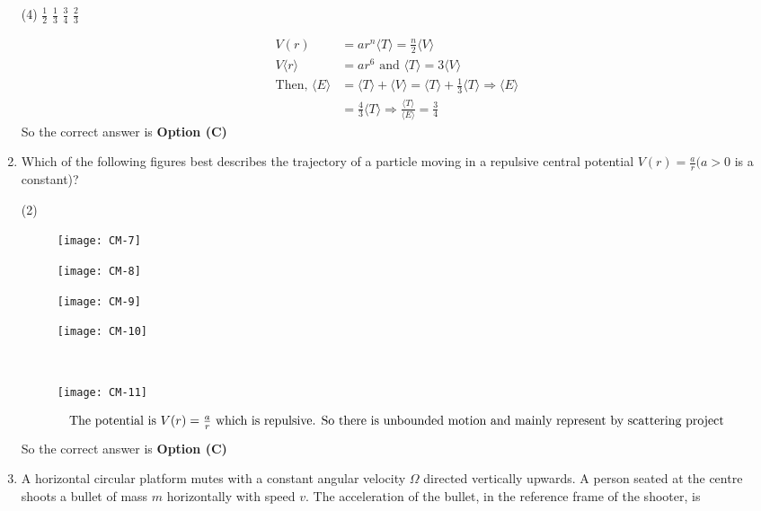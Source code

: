 \begin{enumerate}
\begin{tasks}(4)
\task[\textbf{A.}] $\frac{1}{2}$
\task[\textbf{B.}] $\frac{1}{3}$
\task[\textbf{C.}] $\frac{3}{4}$
\task[\textbf{D.}] $\frac{2}{3}$
\end{tasks}
\begin{answer}
\begin{align*}
V(r)&=a r^{n}\langle T\rangle=\frac{n}{2}\langle V\rangle\\
V\langle r\rangle&=a r^{6}\text{ and }\langle T\rangle=3\langle V\rangle\\
\text{Then, }\langle E\rangle&=\langle T\rangle+\langle V\rangle=\langle T\rangle+\frac{1}{3}\langle T\rangle \Rightarrow\langle E\rangle\\&=\frac{4}{3}\langle T\rangle \Rightarrow \frac{\langle T\rangle}{\langle E\rangle}=\frac{3}{4}
\end{align*}
So the correct answer is \textbf{Option (C)}
\end{answer}
	\item Which of the following figures best describes the trajectory of a particle moving in a repulsive central potential $V(r)=\frac{a}{r}(a>0$ is a constant)?

\begin{tasks}(2)
\task[\textbf{A.}] \begin{figure}[H]
	\centering
	\texttt{[image: CM-7]}
\end{figure}
\task[\textbf{B.}] \begin{figure}[H]
	\centering
	\texttt{[image: CM-8]}
\end{figure}
\task[\textbf{C.}] \begin{figure}[H]
	\centering
	\texttt{[image: CM-9]}
\end{figure}
\task[\textbf{D.}] \begin{figure}[H]
	\centering
	\texttt{[image: CM-10]}
\end{figure}
\end{tasks}
\begin{answer}$\left. \right. $
\begin{figure}[H]
	\centering
	\texttt{[image: CM-11]}
\end{figure}
\begin{align*}
\intertext{The potential is $V(r)=\frac{a}{r}$ which is repulsive. So there is unbounded motion and mainly represent by scattering project}
\end{align*}
So the correct answer is \textbf{Option (C)}
\end{answer}
	\item A horizontal circular platform mutes with a constant angular velocity $\Omega$ directed vertically upwards. A person seated at the centre shoots a bullet of mass $m$ horizontally with speed $v$. The acceleration of the bullet, in the reference frame of the shooter, is


\end{enumerate}
